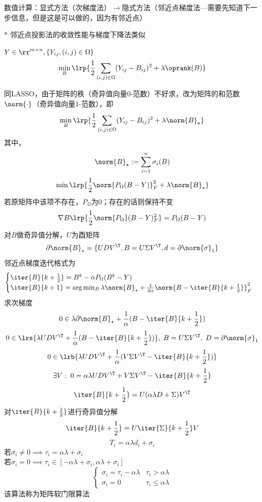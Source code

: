 数值计算：显式方法（次梯度法）$\to$隐式方法（邻近点梯度法---需要先知道下一步信息，但是这是可以做的，因为有邻近点）

* 邻近点投影法的收敛性能与梯度下降法类似

\begin{example}[矩阵补全]
    $Y\in\rr^{m\times n},\{Y_{ij},(i,j)\in\Omega\}$
    \[\min_B\lrp{\frac{1}{2}\sum_{(i,j)\in\Omega}(Y_{ij}-B_{ij})^2+\lambda\oprank(B)}\]
\end{example}
\begin{analysis}
    同LASSO，由于矩阵的秩（奇异值向量0-范数）不好求，改为矩阵的和范数$\norm{\cdot}$（奇异值向量1-范数），即
    \[\min_B\lrp{\frac{1}{2}\sum_{(i,j)\in\Omega}(Y_{ij}-B_{ij})^2+\lambda\norm{B}_\star}\]
    其中，
    \[\norm{B}_\star:=\sum_{i=1}^n\sigma_i(B)\]
    \[\min\lrp{\frac{1}{2}\norm{P_\Omega(B-Y)}_F^2+\lambda\norm{B}_\star}\]
    若原矩阵中该项不存在，$P_\Omega$为$0$；存在的话则保持不变
    \[\nabla B\lrp{\frac{1}{2}\norm{P_\Omega}(B-Y)_F^2}=P_\Omega(B-Y)\]
    对$B$做奇异值分解，$U$为酉矩阵
    \[\partial\norm{B}_\star=\{UDV^\T, B=U\Sigma V^\T, d=\partial\norm{\sigma}_1\}\]
    邻近点梯度迭代格式为
    \[\begin{cases}
        \iter{B}{k+\frac{1}{2}}=B^k-\alpha P_\Omega(B^k-Y)\\
        \iter{B}{k+1}=\arg\min_B\lambda\norm{B}_\star+\frac{1}{2\alpha}\norm{B-\iter{B}{k+\frac{1}{2}}}_F^2
    \end{cases}\]
    求次梯度
    \[0\in\lambda\partial\norm{B}_\star+\frac{1}{\alpha}(B-\iter{B}{k+\frac{1}{2}})\]
    \[0\in\lrs{\lambda UDV^\T+\frac{1}{\alpha}(B-\iter{B}{k+\frac{1}{2}})},\;B=U\Sigma V^\T,\;D=\partial\norm{\sigma}_1\]
    \[0\in\lrb{\lambda UDV^\T +\frac{1}{\alpha}(V\Sigma V^\T-\iter{B}{k+\frac{1}{2}})}\]
    \[\exists V:\;0=\alpha\lambda UDV^\T+V\Sigma V^\T-\iter{B}{k+\frac{1}{2}}\]
    \[\iter{B}{k+\frac{1}{2}}=U(\alpha\lambda D+\Sigma)V^\T\]
    对$\iter{B}{k+\frac{1}{2}}$进行奇异值分解
    \[\iter{B}{k+\frac{1}{2}}=U\iter{\Sigma}{k+\frac{1}{2}}V\]
    \[T_i=\alpha\lambda d_i+\sigma_i\]
    若$\sigma_i\ne 0\implies \tau_i=\alpha\lambda+\sigma_i$\\
    若$\sigma_i=0\implies \tau_i\in[-\alpha\lambda+\sigma_i,\alpha\lambda+\sigma_i]$\\
    \[\begin{cases}
        \sigma_i=\tau_i-\alpha\lambda & \tau_i>\alpha\lambda\\
        \sigma_i=0 & \tau_i\leq\alpha\lambda
    \end{cases}\]
    该算法称为矩阵软门限算法
\end{analysis}

